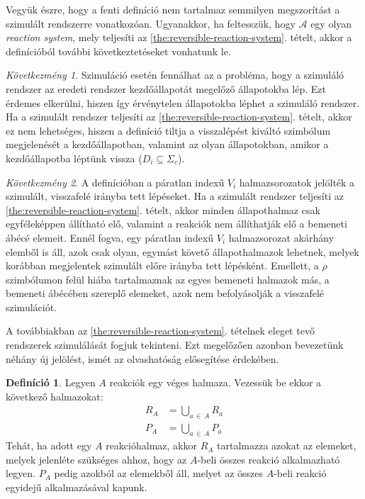 \documentclass[12pt]{article}
\theoremstyle{definition}
\newtheorem{definition}{Definíció}
\theoremstyle{remark}
\theoremstyle{plain}
\theoremstyle{remark}
\newtheorem*{corollary*}{Következmény}
\theoremstyle{plain}
\begin{document}
    Vegyük észre, hogy a fenti definíció nem tartalmaz semmilyen megszorítást a szimulált rendszerre vonatkozóan. Ugyanakkor, ha feltesszük, hogy $\mathscr{A}$ egy olyan \textit{reaction system}, mely teljesíti az \ref{the:reversible-reaction-system}. tételt, akkor a definícióból további következtetéseket vonhatunk le.

    \begin{corollary*}
        Szimuláció esetén fennálhat az a probléma, hogy a szimuláló rendszer az eredeti rendszer kezdőállapotát megelőző állapotokba lép. Ezt érdemes elkerülni, hiszen így érvénytelen állapotokba léphet a szimuláló rendszer. Ha a szimulált rendszer teljesíti az \ref{the:reversible-reaction-system}. tételt, akkor ez nem lehetséges, hiszen a definíció tiltja a visszalépést kiváltó szimbólum megjelenését a kezdőállapotban, valamint az olyan állapotokban, amikor a kezdőállapotba léptünk vissza ($D_{i} \subseteq \Sigma_{c}$).
    \end{corollary*}

    \begin{corollary*}
        A definícióban a páratlan indexű $V_{i}$ halmazsorozatok jelölték a szimulált, visszafelé irányba tett lépéseket. Ha a szimulált rendszer teljesíti az \ref{the:reversible-reaction-system}. tételt, akkor minden állapothalmaz csak egyféleképpen állítható elő, valamint a reakciók nem állíthatják elő a bemeneti ábécé elemeit. Ennél fogva, egy páratlan indexű $V_{i}$ halmazsorozat akárhány elemből is áll, azok csak olyan, egymást követő állapothalmazok lehetnek, melyek korábban megjelentek szimulált előre irányba tett lépésként. Emellett, a $\rho$ szimbólumon felül hiába tartalmaznak az egyes bemeneti halmazok más, a bemeneti ábécében szereplő elemeket, azok nem befolyásolják a visszafelé szimulációt.
    \end{corollary*}

    A továbbiakban az \ref{the:reversible-reaction-system}. tételnek eleget tevő rendszerek szimulálását fogjuk tekinteni. Ezt megelőzően azonban bevezetünk néhány új jelölést, ismét az olvashatóság elősegítése érdekében.

    \begin{definition}
        Legyen $A$ reakciók egy véges halmaza. Vezessük be ekkor a következő halmazokat:
        \begin{align*}
            R_{A} &= \bigcup\limits_{a \,\in\, A} R_{a} \\
            P_{A} &= \bigcup\limits_{a \,\in\, A} P_{a}
        \end{align*}
        Tehát, ha adott egy $A$ reakcióhalmaz, akkor $R_{A}$ tartalmazza azokat az elemeket, melyek jelenléte szükséges ahhoz, hogy az $A$-beli összes reakció alkalmazható legyen. $P_{A}$ pedig azokból az elemekből áll, melyet az összes $A$-beli reakció egyidejű alkalmazásával kapunk.
    \end{definition}
\end{document}
